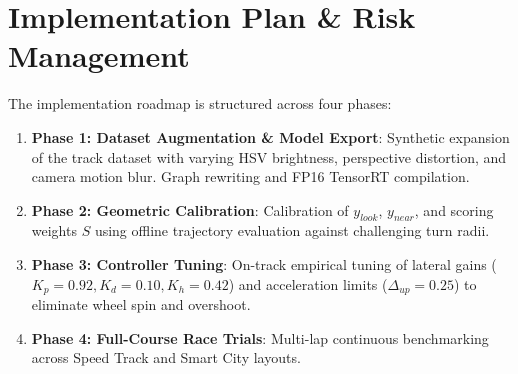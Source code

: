 \documentclass[conference]{IEEEtran}
\begin{document}
\begin{table}[htbp]
    \caption{Latency Breakdown and Edge Performance on Jetson Nano}
    \label{tab:benchmarks}
    \centering
\end{table}

\section{Implementation Plan \& Risk Management}
The implementation roadmap is structured across four phases:
\begin{enumerate}
    \item \textbf{Phase 1: Dataset Augmentation \& Model Export}: Synthetic expansion of the track dataset with varying HSV brightness, perspective distortion, and camera motion blur. Graph rewriting and FP16 TensorRT compilation.
    \item \textbf{Phase 2: Geometric Calibration}: Calibration of $y_{look}$, $y_{near}$, and scoring weights $S$ using offline trajectory evaluation against challenging turn radii.
    \item \textbf{Phase 3: Controller Tuning}: On-track empirical tuning of lateral gains ($K_p=0.92, K_d=0.10, K_h=0.42$) and acceleration limits ($\Delta_{up}=0.25$) to eliminate wheel spin and overshoot.
    \item \textbf{Phase 4: Full-Course Race Trials}: Multi-lap continuous benchmarking across Speed Track and Smart City layouts.
\end{enumerate}
\end{document}
